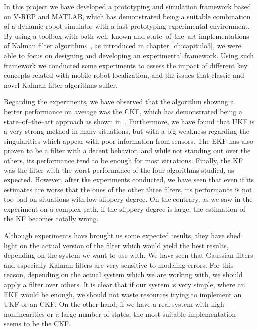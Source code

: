 \pagestyle{scrheadings}
\ihead[]{\rightmark}
\ofoot[]{\thepage{}}
In this project we have developed a prototyping and simulation framework based on V-REP and MATLAB, which has demonstrated being a suitable combination of a dynamic robot simulator with a fast prototyping experimental environment.
By using a toolbox with both well--known and state--of--the--art implementations of Kalman filter algorithms~\cite{toolbox_simo}, as introduced in chapter~\ref{ch:capitulo3}, we were able to focus on designing and developing an experimental framework.
Using such framework we conducted some experiments to assess the impact of different key concepts related with mobile robot localization, and the issues that classic and novel Kalman filter algorithms suffer.

Regarding the experiments, we have observed that the algorithm showing a better performance on average was the \ac{CKF}, which has demonstrated being a state--of--the--art approach as shown in~\cite{zhang_cubature_2013}.
Furthermore, we have found that \ac{UKF} is a very strong method in many situations, but with a big weakness regarding the singularities which appear with poor information from sensors.
The \ac{EKF} has also proven to be a filter with a decent behavior, and while not standing out over the others, its performance tend to be enough for most situations.
Finally, the \ac{KF} was the filter with the worst performance of the four algorithms studied, as expected.
However, after the experiments conducted, we have seen that even if its estimates are worse that the ones of the other three filters, its performance is not too bad on situations with low slippery degree.
On the contrary, as we saw in the experiment on a complex path, if the slippery degree is large, the estimation of the \ac{KF} becomes totally wrong.

Although experiments have brought us some expected results, they have shed light on the actual version of the filter which would yield the best results, depending on the system we want to use with.
We have seen that Gaussian filters and especially Kalman filters are very sensitive to modeling errors.
For this reason, depending on the actual system which we are working with, we should apply a filter over others.
It is clear that if our system is very simple, where an \ac{EKF} would be enough, we should not waste resources trying to implement an \ac{UKF} or an \ac{CKF}.
On the other hand, if we have a real system with high nonlinearities or a large number of states, the most suitable implementation seems to be the \ac{CKF}.

